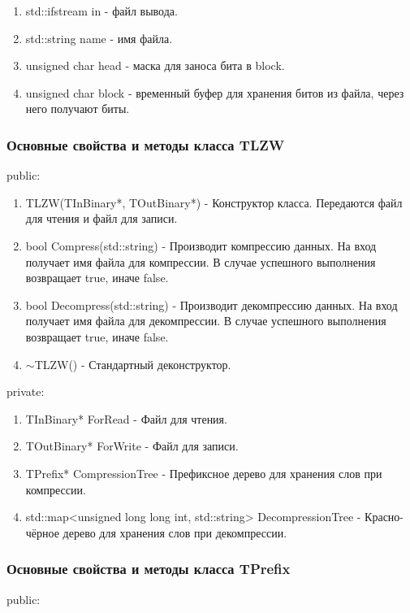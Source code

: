 \documentclass[12pt]{article}
\begin{document}
\begin{enumerate}
	\item std::ifstream in - файл вывода.
    \item std::string name - имя файла.
    \item unsigned char head - маска для заноса бита в block.
    \item unsigned char block - временный буфер для хранения битов из файла, через него получают биты.
\end{enumerate}

\subsubsection*{Основные свойства и методы класса TLZW}
\noindent
public:

\begin{enumerate}
	\item TLZW(TInBinary*, TOutBinary*) - Конструктор класса. Передаются файл для чтения и файл для записи.
	\item bool Compress(std::string) - Производит компрессию данных. На вход получает имя файла для компрессии. В случае успешного выполнения возвращает true, иначе false.
	\item bool Decompress(std::string) - Производит декомпрессию данных. На вход получает имя файла для декомпрессии. В случае успешного выполнения возвращает true, иначе false.
	\item $\sim$TLZW() - Стандартный деконструктор.
\end{enumerate}
\noindent
private:

\begin{enumerate}
	\item TInBinary* ForRead - Файл для чтения.
	\item TOutBinary* ForWrite - Файл для записи.
	\item TPrefix* CompressionTree - Префиксное дерево для хранения слов при компрессии.
	\item std::map<unsigned long long int, std::string> DecompressionTree - Красно-чёрное дерево для хранения слов при декомпрессии.
\end{enumerate}

\subsubsection*{Основные свойства и методы класса TPrefix}

\noindent
public:
\end{document}
